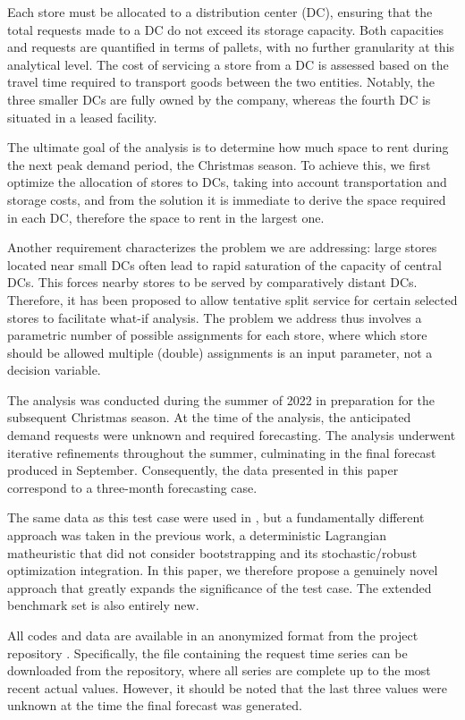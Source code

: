 \documentclass[ijoc,sglanonrev]{informs4}
\begin{document}
Each store must be allocated to a distribution center (DC), ensuring that the total requests made to a DC do not exceed its storage capacity. Both capacities and requests are quantified in terms of pallets, with no further granularity at this analytical level. The cost of servicing a store from a DC is assessed based on the travel time required to transport goods between the two entities. Notably, the three smaller DCs are fully owned by the company, whereas the fourth DC is situated in a leased facility.

The ultimate goal of the analysis is to determine how much space to rent during the next peak demand period, the Christmas season. To achieve this, we first optimize the allocation of stores to DCs, taking into account transportation and storage costs, and from the solution it is immediate to derive the space required in each DC, therefore the space to rent in the largest one.

Another requirement characterizes the problem we are addressing: large stores located near small DCs often lead to rapid saturation of the capacity of central DCs. This forces nearby stores to be served by comparatively distant DCs. Therefore, it has been proposed to allow tentative split service for certain selected stores to facilitate what-if analysis. The problem we address thus involves a parametric number of possible assignments for each store, where which store should be allowed multiple (double) assignments is an input parameter, not a decision variable.  

The analysis was conducted during the summer of 2022 in preparation for the subsequent Christmas season. At the time of the analysis, the anticipated demand requests were unknown and required forecasting. The analysis underwent iterative refinements throughout the summer, culminating in the final forecast produced in September. Consequently, the data presented in this paper correspond to a three-month forecasting case. 

The same data as this test case were used in \citep{MZ23}, but a fundamentally different approach was taken in the previous work, a deterministic Lagrangian matheuristic that did not consider bootstrapping and its stochastic/robust optimization integration. In this paper, we therefore propose a genuinely novel approach that greatly expands the significance of the test case. The extended benchmark set is also entirely new.

All codes and data are available in an anonymized format from the project repository \citep{GDOforecastRepo}. Specifically, the file containing the request time series can be downloaded from the repository, where all series are complete up to the most recent actual values. However, it should be noted that the last three values were unknown at the time the final forecast was generated. 
\end{document}

